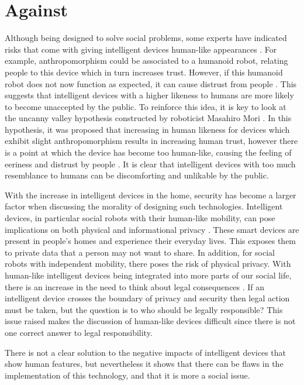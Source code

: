\documentclass{article}
\begin{document}
\section{Against}
Although being designed to solve social problems, some experts have indicated risks that come with giving intelligent devices human-like appearances \cite{phillips2018risks}. For example, anthropomorphism could be associated to a humanoid robot, relating people to this device which in turn increases trust. However, if this humanoid robot does not now function as expected, it can cause distrust from people \cite{phillips2018risks}. This suggests that intelligent devices with a higher likeness to humans are more likely to become unaccepted by the public. To reinforce this idea, it is key to look at the uncanny valley hypothesis constructed by roboticist Masahiro Mori \cite{mara2022uncanny, mori1970valley}. In this hypothesis, it was proposed that increasing in human likeness for devices which exhibit slight anthropomorphism results in increasing human trust, however there is a point at which the device has become too human-like, causing the feeling of eeriness and distrust by people \cite{mara2022uncanny, mori1970valley}. It is clear that intelligent devices with too much resemblance to humans can be discomforting and unlikable by the public.\par
With the increase in intelligent devices in the home, security has become a larger factor when discussing the morality of designing such technologies. Intelligent devices, in particular social robots with their human-like mobility, can pose implications on both physical and informational privacy \cite{lutz2019privacy}. These smart devices are present in people’s homes and experience their everyday lives. This exposes them to private data that a person may not want to share. In addition, for social robots with independent mobility, there poses the risk of physical privacy. With human-like intelligent devices being integrated into more parts of our social life, there is an increase in the need to think about legal consequences \cite{khoury2017legal}. If an intelligent device crosses the boundary of privacy and security then legal action must be taken, but the question is to who should be legally responsible? \cite{khoury2017legal} This issue raised makes the discussion of human-like devices difficult since there is not one correct answer to legal responsibility.\par
There is not a clear solution to the negative impacts of intelligent devices that show human features, but nevertheless it shows that there can be flaws in the implementation of this technology, and that it is more a social issue.
\end{document}
